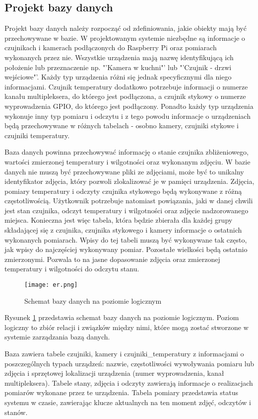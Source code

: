 \documentclass[a4paper,12pt,twoside]{article}
\begin{document}
\subsection{Projekt bazy danych}
Projekt bazy danych należy rozpocząć od zdefiniowania, jakie obiekty mają być przechowywane w bazie. W projektowanym systemie niezbędne są informacje o czujnikach i kamerach podłączonych do Raspberry Pi oraz pomiarach wykonanych przez nie. Wszystkie urządzenia mają nazwę identyfikującą ich położenie lub przeznaczenie np. "'Kamera w kuchni"' lub "'Czujnik - drzwi wejściowe"'. Każdy typ urządzenia różni się jednak specyficznymi dla niego informacjami. Czujnik temperatury dodatkowo potrzebuje informacji o numerze kanału multipleksera, do którego jest podłączona, a czujnik stykowy o numerze wyprowadzenia GPIO, do którego jest podłączony. Ponadto każdy typ urządzenia wykonuje inny typ pomiaru i odczytu i z tego powodu informacje o urządzeniach będą przechowywane w różnych tabelach - osobno kamery, czujniki stykowe i czujniki temperatury.

Baza danych powinna przechowywać informację o stanie czujnika zbliżeniowego, wartości zmierzonej temperatury i wilgotności oraz wykonanym zdjęciu. W bazie danych nie muszą być przechowywane pliki ze zdjęciami, może być to unikalny identyfikator zdjęcia, który pozwoli zlokalizować je w pamięci urządzenia. Zdjęcia, pomiary temperatury i odczyty czujnika stykowego będą wykonywane z różną częstotliwością. Użytkownik potrzebuje natomiast powiązania, jaki w danej chwili jest stan czujnika, odczyt temperatury i wilgotności oraz zdjęcie nadzorowanego miejsca. Konieczna jest więc tabela, która będzie zbierała dla każdej grupy składającej się z czujnika, czujnika stykowego i kamery informacje o ostatnich wykonanych pomiarach. Wpisy do tej tabeli muszą być wykonywane tak często, jak wpisy do najczęściej wykonywany pomiar. Pozostałe wielkości będą ostatnio zmierzonymi. Pozwala to na jasne dopasowanie zdjęcia oraz zmierzonej temperatury i wilgotności do odczytu stanu.

\begin{figure}[h]
\texttt{[image: er.png]}
\caption{Schemat bazy danych na poziomie logicznym}
\label{fig: er}
\end{figure}

Rysunek \ref{fig: er} przedstawia schemat bazy danych na poziomie logicznym. Poziom logiczny to zbiór relacji i związków między nimi, które mogą zostać stworzone w systemie zarządzania bazą danych.  

Baza zawiera tabele czujniki, kamery i czujniki{\_}temperatury z informacjami o poszczególnych typach urządzeń: nazwie, częstotliwości wywoływania pomiaru lub zdjęcia i sprzętowej lokalizacji urządzenia (numer wyprowadzenia, kanał multipleksera). Tabele stany, zdjęcia i odczyty zawierają informacje o realizacjach pomiarów wykonane przez te urządzenia. Tabela pomiary przedstawia status systemu w czasie, zawierając klucze aktualnych na ten moment zdjęć, odczytów i stanów. 
\end{document}
